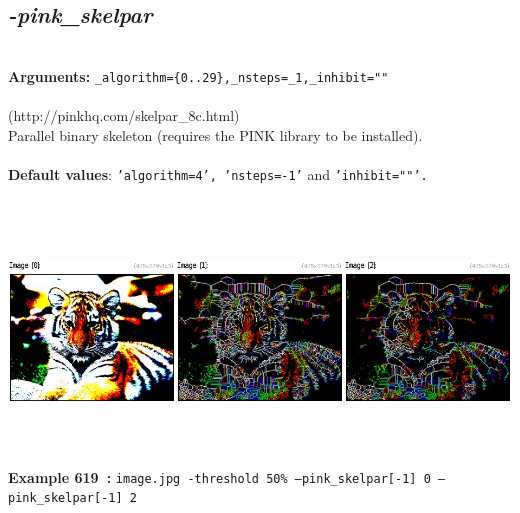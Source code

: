 \documentclass[a4paper,11pt,twoside]{book}
\begin{document}
\subsection{\emph{-pink\_skelpar} }\vspace*{-0.5em}
~\\\textbf{Arguments: } 
{\small \texttt{\_algorithm=\{0..29\},\_nsteps=\_1,\_inhibit=""}}\\~\\
(http://pinkhq.com/skelpar\_8c.html)
~\\Parallel binary skeleton (requires the PINK library to be installed).
~\\~\\\textbf{Default values}: {\small \texttt{'algorithm=4', 'nsteps=-1'} and \texttt{'inhibit=""'.}}
\begin{center}\includegraphics[keepaspectratio=true,height=7cm,width=\textwidth]{img/gmic_def619.jpg}\\
{\footnotesize \textbf{Example 619~:} \texttt{image.jpg -threshold 50\% --pink\_skelpar[-1] 0 --pink\_skelpar[-1] 2}}
\end{center}
\end{document}

